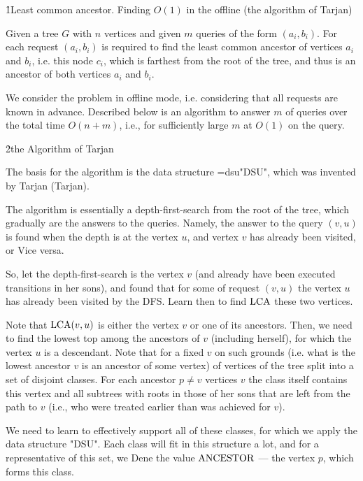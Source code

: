 \h1{Least common ancestor. Finding $O(1)$ in the offline (the algorithm of Tarjan)}

Given a tree $G$ with $n$ vertices and given $m$ queries of the form $(a_i, b_i)$. For each request $(a_i, b_i)$ is required to find the least common ancestor of vertices $a_i$ and $b_i$, i.e. this node $c_i$, which is farthest from the root of the tree, and thus is an ancestor of both vertices $a_i$ and $b_i$.

We consider the problem in offline mode, i.e. considering that all requests are known in advance. Described below is an algorithm to answer $m$ of queries over the total time $O(n+m)$, i.e., for sufficiently large $m$ at $O(1)$ on the query.

\h2{the Algorithm of Tarjan}

The basis for the algorithm is the data structure \algohref=dsu{"DSU"}, which was invented by Tarjan (Tarjan).

The algorithm is essentially a depth-first-search from the root of the tree, which gradually are the answers to the queries. Namely, the answer to the query $(v,u)$ is found when the depth is at the vertex $u$, and vertex $v$ has already been visited, or Vice versa.

So, let the depth-first-search is the vertex $v$ (and already have been executed transitions in her sons), and found that for some of request $(v,u)$ the vertex $u$ has already been visited by the DFS. Learn then to find $\rm LCA$ these two vertices.

Note that ${\rm LCA}(v,u)$ is either the vertex $v$ or one of its ancestors. Then, we need to find the lowest top among the ancestors of $v$ (including herself), for which the vertex $u$ is a descendant. Note that for a fixed $v$ on such grounds (i.e. what is the lowest ancestor $v$ is an ancestor of some vertex) of vertices of the tree split into a set of disjoint classes. For each ancestor $p \not= v$ vertices $v$ the class itself contains this vertex and all subtrees with roots in those of her sons that are left from the path to $v$ (i.e., who were treated earlier than was achieved for $v$).

We need to learn to effectively support all of these classes, for which we apply the data structure "DSU". Each class will fit in this structure a lot, and for a representative of this set, we Dene the value $\rm ANCESTOR$ --- the vertex $p$, which forms this class.

